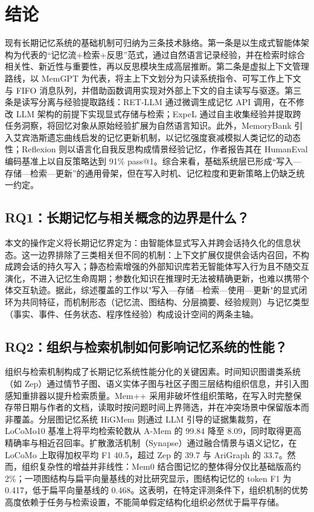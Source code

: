 

\section{结论}

现有长期记忆系统的基础机制可归纳为三条技术脉络。第一条是以生成式智能体架构为代表的“记忆流+检索+反思”范式，通过自然语言记录经验，并在检索时综合相关性、新近性与重要性，再以反思模块生成高层推断\cite{W0001}。第二条是虚拟上下文管理路线，以 MemGPT 为代表，将主上下文划分为只读系统指令、可写工作上下文与 FIFO 消息队列，并借助函数调用实现对外部上下文的自主读写与驱逐\cite{W0002}。第三条是读写分离与经验提取路线：RET-LLM 通过微调生成记忆 API 调用，在不修改 LLM 架构的前提下实现显式存储与检索\cite{W0680}；ExpeL 通过自主收集经验并提取跨任务洞察，将回忆对象从原始经验扩展为自然语言知识\cite{W0618}。此外，MemoryBank 引入艾宾浩斯遗忘曲线启发的记忆更新机制，以记忆强度衰减模拟人类记忆的动态性\cite{W0003}；Reflexion 则以语言化自我反思构成情景经验记忆，作者报告其在 HumanEval 编码基准上以自反策略达到 91\% pass@1\cite{W0004}。综合来看，基础系统层已形成“写入—存储—检索—更新”的通用骨架，但在写入时机、记忆粒度和更新策略上仍缺乏统一约定\cite{W0001,W0002,W0680,W0618}。

\subsection{RQ1：长期记忆与相关概念的边界是什么？}

本文的操作定义将长期记忆界定为：由智能体显式写入并跨会话持久化的信息状态。这一边界排除了三类相关但不同的机制：上下文扩展仅提供会话内召回，不构成跨会话的持久写入\cite{W0039}；静态检索增强的外部知识库若无智能体写入行为且不随交互演化，不进入记忆生命周期\cite{W0039}；参数化知识在推理时无法被精确更新，也难以携带个体交互轨迹\cite{W0002,W0618}。据此，综述覆盖的工作以"写入—存储—检索—使用—更新"的显式闭环为共同特征，而机制形态（记忆流、图结构、分层摘要、经验规则）与记忆类型（事实、事件、任务状态、程序性经验）构成设计空间的两条主轴\cite{W0140,W0039}。

\subsection{RQ2：组织与检索机制如何影响记忆系统的性能？}

组织与检索机制构成了长期记忆系统性能分化的关键因素。时间知识图谱类系统（如 Zep）通过情节子图、语义实体子图与社区子图三层结构组织信息，并引入图感知重排器以提升检索质量\cite{W0684}。Mem++ 采用非破坏性组织策略，在写入时完整保存带日期与作者的文档，读取时按问题时间上界筛选，并在冲突场景中保留版本而非覆盖\cite{W0028}。分层图记忆系统 HiGMem 则通过 LLM 引导的证据集裁剪，在 LoCoMo10 基准上将平均检索轮数从 A-Mem 的 99.84 降至 8.09，同时取得更高精确率与相近召回率\cite{W0030}。扩散激活机制（Synapse）通过融合情景与语义记忆，在 LoCoMo 上取得加权平均 F1 40.5，超过 Zep 的 39.7 与 AriGraph 的 33.7\cite{W0099}。然而，组织复杂性的增益并非线性：Mem0 结合图记忆的整体得分仅比基础版高约 2\%\cite{W0682}；一项图结构与扁平向量基线的对比研究显示，图结构记忆的 token F1 为 0.417，低于扁平向量基线的 0.468\cite{W0034}。这表明，在特定评测条件下，组织机制的优势高度依赖于任务与检索设置，不能简单假定结构化组织必然优于扁平存储\cite{W0034,W0682}。


